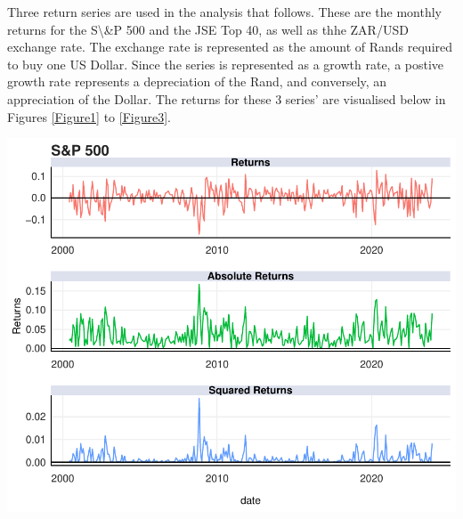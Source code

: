 \documentclass[11pt,preprint, authoryear]{elsarticle}
\let\origfigure\figure
\let\endorigfigure\endfigure
\renewenvironment{figure}[1][2] {
    \expandafter\origfigure\expandafter[H]
} {
    \endorigfigure
}
\numberwithin{equation}{section}
\numberwithin{figure}{section}
\numberwithin{table}{section}
\begin{document}
Three return series are used in the analysis that follows. These are the
monthly returns for the S\textbackslash\&P 500 and the JSE Top 40, as
well as thhe ZAR/USD exchange rate. The exchange rate is represented as
the amount of Rands required to buy one US Dollar. Since the series is
represented as a growth rate, a postive growth rate represents a
depreciation of the Rand, and conversely, an appreciation of the Dollar.
The returns for these 3 series' are visualised below in Figures
\ref{Figure1} to \ref{Figure3}.

\begin{figure}[H]

{\centering \includegraphics{Template_files/figure-latex/Figure1-1} 

}

\caption{S\&P 500 Returns \label{Figure1}}\label{fig:Figure1}
\end{figure}
\end{document}
